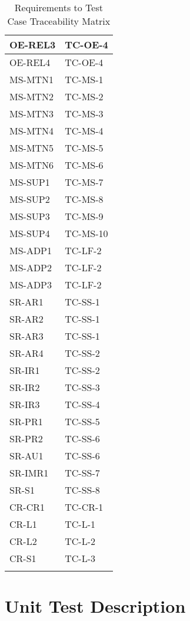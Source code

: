 \documentclass[12pt, titlepage]{article}
\begin{document}
\begin{longtable}{|l|l|}
  OE-REL3 & TC-OE-4 \\ \hline
  OE-REL4 & TC-OE-4 \\ \hline
  MS-MTN1 & TC-MS-1 \\ \hline
  MS-MTN2 & TC-MS-2 \\ \hline
  MS-MTN3 & TC-MS-3 \\ \hline
  MS-MTN4 & TC-MS-4 \\ \hline
  MS-MTN5 & TC-MS-5 \\ \hline
  MS-MTN6 & TC-MS-6 \\ \hline
  MS-SUP1 & TC-MS-7 \\ \hline
  MS-SUP2 & TC-MS-8 \\ \hline
  MS-SUP3 & TC-MS-9 \\ \hline
  MS-SUP4 & TC-MS-10 \\ \hline
  MS-ADP1 & TC-LF-2 \\ \hline
  MS-ADP2 & TC-LF-2 \\ \hline
  MS-ADP3 & TC-LF-2 \\ \hline
  SR-AR1 & TC-SS-1 \\ \hline
  SR-AR2 & TC-SS-1 \\ \hline
  SR-AR3 & TC-SS-1 \\ \hline
  SR-AR4 & TC-SS-2 \\ \hline
  SR-IR1 & TC-SS-2 \\ \hline
  SR-IR2 & TC-SS-3 \\ \hline
  SR-IR3 & TC-SS-4 \\ \hline
  SR-PR1 & TC-SS-5\\ \hline
  SR-PR2 & TC-SS-6 \\ \hline
  SR-AU1 & TC-SS-6 \\ \hline
  SR-IMR1 & TC-SS-7 \\ \hline
  SR-S1 & TC-SS-8 \\ \hline
  CR-CR1 & TC-CR-1 \\ \hline
  CR-L1 & TC-L-1 \\ \hline
  CR-L2 & TC-L-2 \\ \hline
  CR-S1 & TC-L-3 \\ \hline
  \caption{Requirements to Test Case Traceability Matrix}
\end{longtable}

\section{Unit Test Description}

\end{document}
